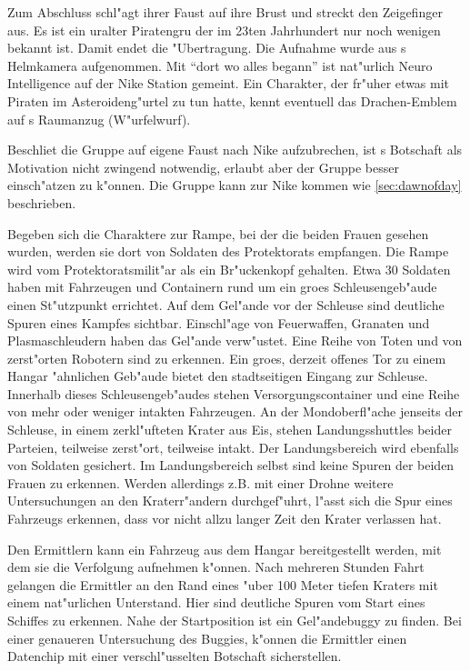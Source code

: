 Zum Abschluss schl"agt \xl{} ihrer Faust auf ihre Brust und streckt den Zeigefinger aus. Es ist ein uralter Piratengru\3 der im 23ten Jahrhundert nur noch wenigen bekannt ist. Damit endet die "Ubertragung. Die Aufnahme wurde aus \ml{}s Helmkamera aufgenommen. Mit ``dort wo alles begann'' ist nat"urlich Neuro Intelligence auf der Nike Station gemeint. Ein Charakter, der fr"uher etwas mit Piraten im Asteroideng"urtel zu tun hatte, kennt eventuell das Drachen-Emblem auf \xl{}s Raumanzug (W"urfelwurf).

Beschlie\3t die Gruppe auf eigene Faust nach Nike aufzubrechen, ist \xl{}s Botschaft als Motivation nicht zwingend notwendig, erlaubt aber der Gruppe \xl{} besser einsch"atzen zu k"onnen. Die Gruppe kann zur Nike kommen wie \cref{sec:dawnofday} beschrieben.

Begeben sich die Charaktere zur Rampe, bei der die beiden Frauen gesehen wurden, werden sie dort von Soldaten des Protektorats empfangen. Die Rampe wird vom Protektoratsmilit"ar als ein Br"uckenkopf gehalten. Etwa 30 Soldaten haben mit Fahrzeugen und Containern rund um ein gro\3es Schleusengeb"aude einen St"utzpunkt errichtet. Auf dem Gel"ande vor der Schleuse sind deutliche Spuren eines Kampfes sichtbar. Einschl"age von Feuerwaffen, Granaten und Plasmaschleudern haben das Gel"ande verw"ustet. Eine Reihe von Toten und von zerst"orten Robotern sind zu erkennen. Ein gro\3es, derzeit offenes Tor zu einem Hangar "ahnlichen Geb"aude bietet den stadtseitigen Eingang zur Schleuse. Innerhalb dieses Schleusengeb"audes stehen Versorgungscontainer und eine Reihe von mehr oder weniger intakten Fahrzeugen. An der Mondoberfl"ache jenseits der Schleuse, in einem zerkl"ufteten Krater aus Eis, stehen Landungsshuttles beider Parteien, teilweise zerst"ort, teilweise intakt. Der Landungsbereich wird ebenfalls von Soldaten gesichert. Im Landungsbereich selbst sind keine Spuren der beiden Frauen zu erkennen. Werden allerdings z.B. mit einer Drohne weitere Untersuchungen an den Kraterr"andern durchgef"uhrt, l"asst sich die Spur eines Fahrzeugs erkennen, dass vor nicht allzu langer Zeit den Krater verlassen hat. 

Den Ermittlern kann ein Fahrzeug aus dem Hangar bereitgestellt werden, mit dem sie die Verfolgung aufnehmen k"onnen. Nach mehreren Stunden Fahrt gelangen die Ermittler an den Rand eines "uber 100 Meter tiefen Kraters mit einem nat"urlichen Unterstand. Hier sind deutliche Spuren vom Start eines Schiffes zu erkennen. Nahe der Startposition ist ein Gel"andebuggy zu finden. Bei einer genaueren Untersuchung des Buggies, k"onnen die Ermittler einen Datenchip mit einer verschl"usselten Botschaft sicherstellen.

